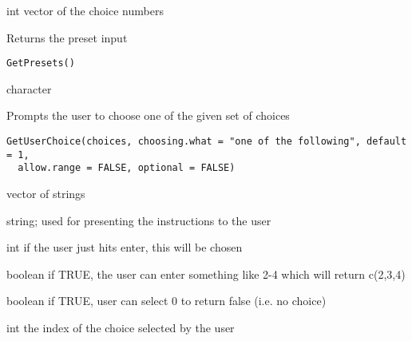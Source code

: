 \documentclass[a4paper]{book}
\begin{document}
%
\begin{Value}
int vector of the choice numbers
\end{Value}
%
\begin{Description}\relax
Returns the preset input
\end{Description}
%
\begin{Usage}
\begin{verbatim}
GetPresets()
\end{verbatim}
\end{Usage}
%
\begin{Value}
character
\end{Value}
%
\begin{Description}\relax
Prompts the user to choose one of the given set of choices
\end{Description}
%
\begin{Usage}
\begin{verbatim}
GetUserChoice(choices, choosing.what = "one of the following", default = 1,
  allow.range = FALSE, optional = FALSE)
\end{verbatim}
\end{Usage}
%
\begin{Arguments}
\begin{ldescription}
\item[\code{choices}] vector of strings

\item[\code{choosing.what}] string; used for presenting the instructions to the user

\item[\code{default}] int if the user just hits enter, this will be chosen

\item[\code{allow.range}] boolean if TRUE, the user can enter something like 2-4 which will return c(2,3,4)

\item[\code{optional}] boolean if TRUE, user can select 0 to return false (i.e. no choice)
\end{ldescription}
\end{Arguments}
%
\begin{Value}
int the index of the choice selected by the user
\end{Value}
\end{document}
